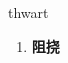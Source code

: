 
\begin{frame}
{\huge thwart}
\begin{center}
\begin{enumerate}\Large
  \item \textbf{阻挠}
\end{enumerate}
\end{center}
\end{frame}
